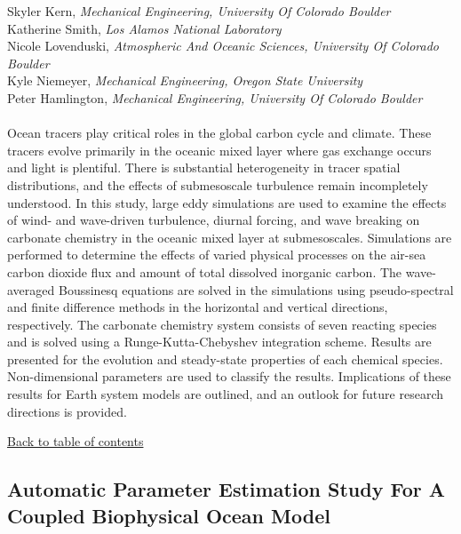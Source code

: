 {Skyler Kern}, \textit{Mechanical Engineering, University Of Colorado Boulder}\\ 
{Katherine Smith}, \textit{Los Alamos National Laboratory}\\ 
{Nicole Lovenduski}, \textit{Atmospheric And Oceanic Sciences, University Of Colorado Boulder}\\ 
{Kyle Niemeyer}, \textit{Mechanical Engineering, Oregon State University}\\ 
{Peter Hamlington}, \textit{Mechanical Engineering, University Of Colorado Boulder}\\ 
\vspace{-0.1 in} \\ 
\noindent Ocean tracers play critical roles in the global carbon cycle and climate. These tracers evolve primarily in the oceanic mixed layer where gas exchange occurs and light is plentiful. There is substantial heterogeneity in tracer spatial distributions, and the effects of submesoscale turbulence remain incompletely understood. In this study, large eddy simulations are used to examine the effects of wind- and wave-driven turbulence, diurnal forcing, and wave breaking on carbonate chemistry in the oceanic mixed layer at submesoscales. Simulations are performed to determine the effects of varied physical processes on the air-sea carbon dioxide flux and amount of total dissolved inorganic carbon. The wave-averaged Boussinesq equations are solved in the simulations using pseudo-spectral and finite difference methods in the horizontal and vertical directions, respectively. The carbonate chemistry system consists of seven reacting species and is solved using a Runge-Kutta-Chebyshev integration scheme. Results are presented for the evolution and steady-state properties of each chemical species. Non-dimensional parameters are used to classify the results. Implications of these results for Earth system models are outlined, and an outlook for future research directions is provided. \\ 
\begin{flushright}\vspace{-0.2 in}\hyperlink{toc}{Back to table of contents}\end{flushright}\vspace{-0.2 in}
\hypertarget{SkylerKern}{\subsection*{\color{CUGOLD} Automatic Parameter Estimation Study For A Coupled Biophysical Ocean Model}} \vsp 
